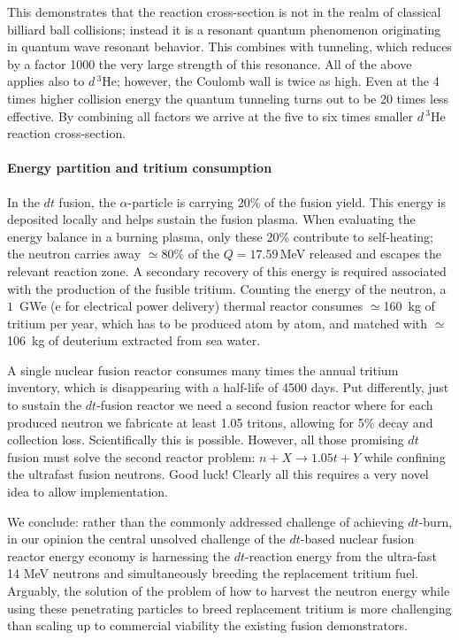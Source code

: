 \documentclass[particles,article,accept,pdftex,moreauthors]{Definitions/mdpi}
\begin{document}
This demonstrates that the reaction cross-section is not in the realm of classical billiard ball collisions; instead it is a resonant quantum phenomenon originating in quantum wave resonant behavior. This combines with tunneling, which reduces by a factor 1000 the very large strength of this resonance. All of the above applies also to $d\,{}^{3\!}\mathrm{He}$; however, the Coulomb wall is twice as high. Even at the 4 times higher collision energy the quantum tunneling turns out to be 20 times less effective. By combining all factors we arrive at the five to six times smaller $d\,{}^{3}\mathrm{He}$ reaction cross-section.

\paragraph*{\bf Energy partition and tritium consumption}
In the $dt$ fusion, the $\alpha$-particle is carrying 20\% of the fusion yield. This energy is deposited locally and helps sustain the fusion plasma. When evaluating the energy balance in a burning plasma, only these 20\% contribute to self-heating; the neutron carries away $\simeq$80\% of the $Q=17.59$\,MeV released and escapes the relevant reaction zone. A secondary recovery of this energy is required associated with the production of the fusible tritium. Counting the energy of the neutron, a $1$~GWe (e for electrical power delivery) thermal reactor consumes $\simeq$160~kg of tritium per year, which has to be produced atom by atom, and matched with $\simeq$106~kg of deuterium extracted from sea water. 

A single nuclear fusion reactor consumes many times the annual tritium inventory, which is disappearing with a half-life of 4500 days. Put differently, just to sustain the $dt$-fusion reactor we need a second fusion reactor where for each produced neutron we fabricate at least 1.05 tritons, allowing for 5\% decay and collection loss. Scientifically this is possible. However, all those promising $dt$ fusion must solve the second reactor problem: $n+X\to 1.05 t+Y$ while confining the ultrafast fusion neutrons. Good luck! Clearly all this requires a very novel idea to allow implementation.

We conclude: rather than the commonly addressed challenge of achieving $dt$-burn, in our opinion the central unsolved challenge of the $dt$-based nuclear fusion reactor energy economy is harnessing the $dt$-reaction energy from the ultra-fast 14 MeV neutrons and simultaneously breeding the replacement tritium fuel. Arguably, the solution of the problem of how to harvest the neutron energy while using these penetrating particles to breed replacement tritium is more challenging than scaling up to commercial viability the existing fusion demonstrators.
\end{document}
